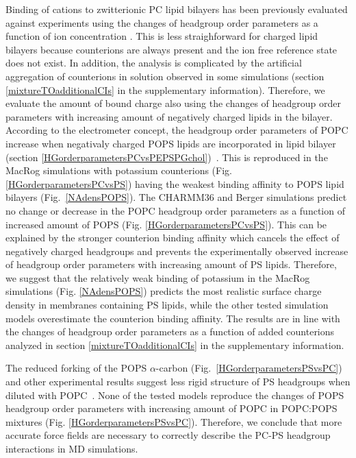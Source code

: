 \documentclass[aps,prl,superscriptaddress,twocolumn]{revtex4}
\begin{document}
Binding of cations to zwitterionic PC lipid bilayers has been previously
evaluated against experiments using the changes of headgroup order parameters
as a function of ion concentration \cite{catte16}. This is less straighforward
for charged lipid bilayers because counterions are always present and the
ion free reference state does not exist.
In addition, the analysis is complicated by the artificial aggregation of counterions
in solution observed in some simulations (section \ref{mixtureTOadditionalCIs} in the supplementary information).
Therefore, we evaluate the amount of bound charge also using the changes of
headgroup order parameters with increasing amount of negatively charged lipids in the bilayer.
According to the electrometer concept, the headgroup order parameters of POPC
increase when negativaly charged POPS lipids are incorporated in lipid bilayer
(section \ref{HGorderparametersPCvsPEPSPGchol})~\cite{seelig87,scherer87}.
This is reproduced in the MacRog simulations with potassium counterions (Fig. \ref{HGorderparametersPCvsPS})
having the weakest binding affinity to POPS lipid bilayers (Fig.~\ref{NAdensPOPS}).
The CHARMM36 and Berger simulations predict no change or decrease
in the POPC headgroup order parameters as a function of increased amount of POPS (Fig. \ref{HGorderparametersPCvsPS}).
This can be explained by the stronger counterion binding affinity which cancels
the effect of negatively charged headgroups and prevents the experimentally observed
increase of headgroup order parameters with increasing amount of PS lipids.
Therefore, we suggest that the relatively weak binding of potassium
in the MacRog simulations (Fig. \ref{NAdensPOPS}) predicts the most
realistic surface charge density in membranes containing PS lipids,
while the other tested simulation models overestimate the counterion
binding affinity. The results are in line with the changes of headgroup order
parameters as a function of added counterions analyzed in section \ref{mixtureTOadditionalCIs}
in the supplementary information.

The reduced forking of the POPS $\alpha$-carbon (Fig.~\ref{HGorderparametersPSvsPC})
and other experimental results suggest less rigid structure of PS headgroups when diluted with
POPC~\cite{browning80,buldt81,roux90,roux91,scherer87}.
None of the tested models reproduce the changes of POPS headgroup order
parameters with increasing amount of POPC in POPC:POPS mixtures (Fig. \ref{HGorderparametersPSvsPC}).
Therefore, we conclude that more accurate force fields are necessary
to correctly describe the PC-PS headgroup interactions in MD simulations.
\end{document}

